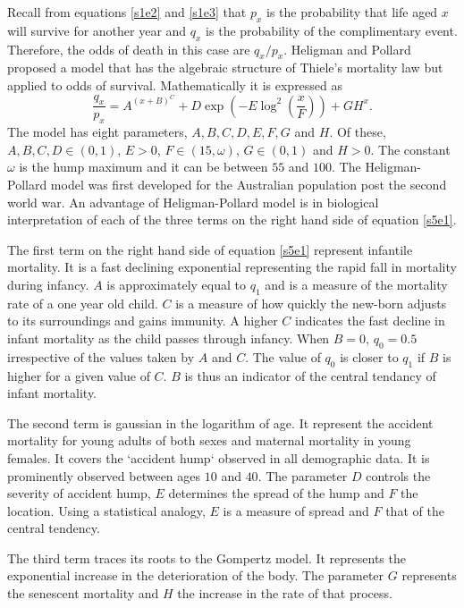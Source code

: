 \documentclass{article}
\numberwithin{equation}{section}
\begin{document}
Recall from equations \eqref{s1e2} and \eqref{s1e3} that $p_x$ is the 
probability that life aged $x$ will survive for another year and $q_x$ is
the probability of the complimentary event. Therefore, the odds of death in 
this case are $q_x/p_x$.  Heligman and Pollard \cite{heligman1980age} proposed 
a model that has the algebraic structure of Thiele's mortality law but 
applied to odds of survival. Mathematically it is expressed as
\begin{equation}\label{s5e1}
\frac{q_x}{p_x} = A^{(x+B)^C}+
D\exp\left(-E\log^2\left(\frac{x}{F}\right)\right) + GH^x.
\end{equation}
The model has eight parameters, $A, B, C, D, E, F, G$ and $H$. Of these, $A,
B, C, D \in (0, 1)$, $E > 0$, $F \in (15, \omega)$, $G \in (0, 1)$ and $H
> 0$. The constant $\omega$ is the hump maximum and it can be between $55$
and $100$. The Heligman-Pollard model was first developed for the Australian
population post the second world war. An advantage of Heligman-Pollard model 
is in biological interpretation of each of the three terms on the right hand 
side of equation \eqref{s5e1}.

The first term on the right hand side of equation \eqref{s5e1} represent 
infantile mortality. It is a fast declining exponential representing the 
rapid fall in mortality during infancy. $A$ is approximately equal to $q_1$ 
and is a measure of the mortality rate of a one year old child. $C$ is a 
measure of how quickly the new-born adjusts to its surroundings and gains 
immunity. A higher $C$ indicates the fast decline in infant mortality as the
child passes through infancy. When $B = 0$, $q_0 = 0.5$ irrespective of the
values taken by $A$ and $C$. The value of $q_0$ is closer to $q_1$ if $B$ is
higher for a given value of $C$. $B$ is thus an indicator of the central 
tendancy of infant mortality. 

The second term is gaussian in the logarithm of age. It represent the accident
mortality for young adults of both sexes and maternal mortality in young 
females. It covers the `accident hump` observed in all demographic data. It
is prominently observed between ages $10$ and $40$. The parameter $D$ controls 
the severity of accident hump, $E$ determines the spread of the hump and $F$ 
the location.  Using a statistical analogy, $E$ is a measure of spread and 
$F$ that of the central tendency. 

The third term traces its roots to the Gompertz model. It represents the
exponential increase in the deterioration of the body. The parameter $G$ 
represents the senescent mortality and $H$ the increase in the rate of that
process.
\end{document}
